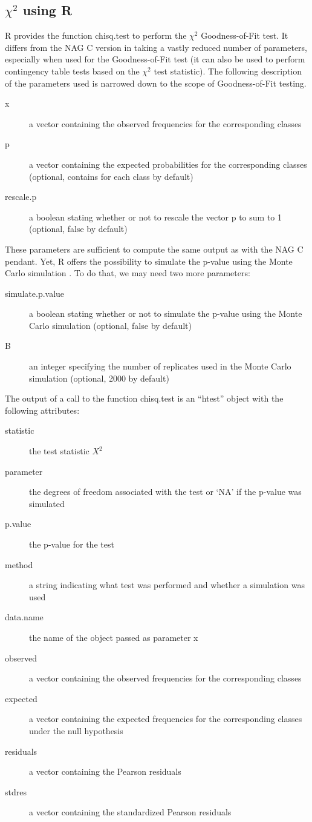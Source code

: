 \documentclass{article}
\begin{document}
\subsection{$\chi^2$ using R}
R provides the function chisq.test to perform the $\chi^2$ Goodness-of-Fit test.
It differs from the NAG C version in taking a vastly reduced number of parameters, especially when used for the Goodness-of-Fit test (it can also be used to perform contingency table tests based on the $\chi^2$ test statistic).
The following description of the parameters used is narrowed down to the scope of Goodness-of-Fit testing.
\begin{description}
	\item[x] a vector containing the observed frequencies for the corresponding classes
	\item[p] a vector containing the expected probabilities for the corresponding classes (optional, contains  for each class by default)
	\item[rescale.p] a boolean stating whether or not to rescale the vector p to sum to 1 (optional, false by default)
\end{description}
These parameters are sufficient to compute the same output as with the NAG C pendant.
Yet, R offers the possibility to simulate the p-value using the Monte Carlo simulation \cite{Rubinstein:2007:SMC:1349778}.
To do that, we may need two more parameters:
\begin{description}
	\item[simulate.p.value] a boolean stating whether or not to simulate the p-value using the Monte Carlo simulation (optional, false by default)
	\item[B] an integer specifying the number of replicates used in the Monte Carlo simulation (optional, 2000 by default)
\end{description}
The output of a call to the function chisq.test is an ``htest'' object with the following attributes:
\begin{description}
	\item[statistic] the test statistic $X^2$
	\item[parameter] the degrees of freedom associated with the test or `NA' if the p-value was simulated
	\item[p.value] the p-value for the test
	\item[method] a string indicating what test was performed and whether a simulation was used
	\item[data.name] the name of the object passed as parameter x
	\item[observed] a vector containing the observed frequencies for the corresponding classes
	\item[expected] a vector containing the expected frequencies for the corresponding classes under the null hypothesis
	\item[residuals] a vector containing the Pearson residuals
	\item[stdres] a vector containing the standardized Pearson residuals
\end{description}
\end{document}
